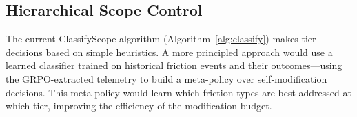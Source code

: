 \subsection{Hierarchical Scope Control}
\label{sec:scope-control}

The current ClassifyScope algorithm (Algorithm~\ref{alg:classify}) makes
tier decisions based on simple heuristics. A more principled approach would
use a learned classifier trained on historical friction events and their
outcomes---using the GRPO-extracted telemetry to build a meta-policy over
self-modification decisions. This meta-policy would learn which friction types
are best addressed at which tier, improving the efficiency of the modification
budget.

